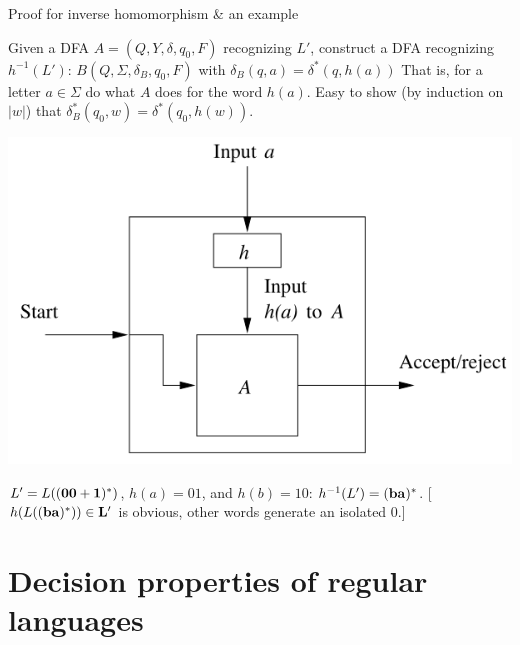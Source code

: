 \documentclass[handout]{beamer}
\begin{document}
\begin{frame}{Proof for inverse homomorphism \& an example}

    Given a DFA $A=(Q,Y, \delta,q_0,F)$ recognizing $L'$, construct a DFA recognizing $h^{-1}(L')$: \alert{$B(Q,\Sigma, \delta_B,q_0,F)$} with \alert{$\delta_B(q,a)=\delta^*(q,h(a))$}     
    That is, for a letter $a\in\Sigma$ do what $A$ does for the word $h(a)$. Easy to show (by induction on $|w|$) that $\delta_B^*(q_0,w)=\delta^*(q_0,h(w))$.
    \begin{center}
        \includegraphics[scale=0.5]{files/inverseHomDFA.PNG}
    \end{center}
    \vspace{-24pt}\hfill\qedsymbol
    \begin{example}
        $L'=L((\bf{00}+\bf{1})^*)$, $h(a)=01$, and $h(b)=10$: $h^{-1}(L')=(\bf{ba})^*$.
        [$h(L((\bf{ba})^*))\in L'$ is obvious, other words generate an isolated 0.]        
    \end{example}

\end{frame}


\section*{Decision properties of regular languages}
\end{document}
